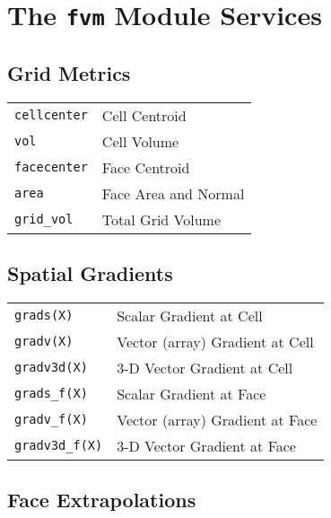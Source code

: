 \chapter{The {\tt fvm} Module Services}

\section{Grid Metrics}

\begin{center}
\begin{tabular}[h]{|l|l|}
\hline
{\tt cellcenter} & Cell Centroid\\
{\tt vol} & Cell Volume\\
{\tt facecenter} & Face Centroid\\
{\tt area} & Face Area and Normal\\
{\tt grid\_vol} & Total Grid Volume\\
\hline
\end{tabular}
\end{center}

\section{Spatial Gradients}

\begin{center}
\begin{tabular}[h]{|l|l|}
\hline
{\tt grads(X)} & Scalar Gradient at Cell \\
{\tt gradv(X)} & Vector (array) Gradient at Cell\\
{\tt gradv3d(X)} & 3-D Vector Gradient at Cell\\
{\tt grads\_f(X)} & Scalar Gradient at Face\\
{\tt gradv\_f(X)} & Vector (array) Gradient at Face\\
{\tt gradv3d\_f(X)} & 3-D Vector Gradient at Face\\
\hline
\end{tabular}
\end{center}

\section{Face Extrapolations}

